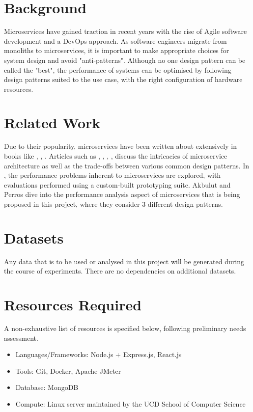 \section{Background}
Microservices have gained traction in recent years with the rise of Agile software development and a DevOps \cite{awsDevOps} approach. As software engineers migrate from monoliths to microservices, it is important to make appropriate choices for system design and avoid "anti-patterns". Although no one design pattern can be called the "best", the performance of systems can be optimised by following design patterns suited to the use case, with the right configuration of hardware resources.

\section{Related Work}
Due to their popularity, microservices have been written about extensively in books like \cite{richardson18}, \cite{kleppmann17}, \cite{newman14}. Articles such as \cite{md19}, \cite{md20}, \cite{sahiti20}, \cite{udantha19}, \cite{lewis14} discuss the intricacies of microservice architecture as well as the trade-offs between various common design patterns. In \cite{cully20}, the performance problems inherent to microservices are explored, with evaluations performed using a custom-built prototyping suite. Akbulut and Perros \cite{akbulut19} dive into the performance analysis aspect of microservices that is being proposed in this project, where they consider 3 different design patterns.

\section{Datasets}
Any data that is to be used or analysed in this project will be generated during the course of experiments. There are no dependencies on additional datasets.

\section{Resources Required}

A non-exhaustive list of resources is specified below, following preliminary needs assessment.

\begin{itemize}
	\item Languages/Frameworks: Node.js + Express.js, React.js
	\item Tools: Git, Docker, Apache JMeter
	\item Database: MongoDB
	\item Compute: Linux server maintained by the UCD School of Computer Science
\end{itemize}

